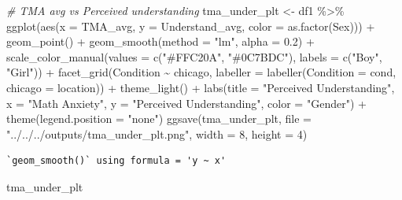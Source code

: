 \documentclass[
  letterpaper,
  DIV=11,
  numbers=noendperiod]{scrartcl}
\newenvironment{Shaded}{\begin{snugshade}}{\end{snugshade}}
\newcommand{\AttributeTok}[1]{\textcolor[rgb]{0.49,0.56,0.16}{#1}}
\newcommand{\CommentTok}[1]{\textcolor[rgb]{0.38,0.63,0.69}{\textit{#1}}}
\newcommand{\DecValTok}[1]{\textcolor[rgb]{0.25,0.63,0.44}{#1}}
\newcommand{\FloatTok}[1]{\textcolor[rgb]{0.25,0.63,0.44}{#1}}
\newcommand{\FunctionTok}[1]{\textcolor[rgb]{0.02,0.16,0.49}{#1}}
\newcommand{\NormalTok}[1]{\textcolor[rgb]{0.00,0.44,0.13}{#1}}
\newcommand{\OtherTok}[1]{\textcolor[rgb]{0.00,0.44,0.13}{#1}}
\newcommand{\SpecialCharTok}[1]{\textcolor[rgb]{0.25,0.44,0.63}{#1}}
\newcommand{\StringTok}[1]{\textcolor[rgb]{0.25,0.44,0.63}{#1}}
\begin{document}
\begin{Shaded}
\begin{Highlighting}[]
\CommentTok{\# TMA avg vs Perceived understanding}
\NormalTok{tma\_under\_plt }\OtherTok{\textless{}{-}}\NormalTok{ df1 }\SpecialCharTok{\%\textgreater{}\%} \FunctionTok{ggplot}\NormalTok{(}\FunctionTok{aes}\NormalTok{(}\AttributeTok{x =}\NormalTok{ TMA\_avg, }\AttributeTok{y =}\NormalTok{ Understand\_avg, }
                   \AttributeTok{color =} \FunctionTok{as.factor}\NormalTok{(Sex))) }\SpecialCharTok{+}
  \FunctionTok{geom\_point}\NormalTok{() }\SpecialCharTok{+} \FunctionTok{geom\_smooth}\NormalTok{(}\AttributeTok{method =} \StringTok{"lm"}\NormalTok{, }\AttributeTok{alpha =} \FloatTok{0.2}\NormalTok{) }\SpecialCharTok{+}
  \FunctionTok{scale\_color\_manual}\NormalTok{(}\AttributeTok{values =} \FunctionTok{c}\NormalTok{(}\StringTok{"\#FFC20A"}\NormalTok{, }\StringTok{"\#0C7BDC"}\NormalTok{), }
                     \AttributeTok{labels =} \FunctionTok{c}\NormalTok{(}\StringTok{"Boy"}\NormalTok{, }\StringTok{"Girl"}\NormalTok{)) }\SpecialCharTok{+}
  \FunctionTok{facet\_grid}\NormalTok{(Condition }\SpecialCharTok{\textasciitilde{}}\NormalTok{ chicago, }
             \AttributeTok{labeller =} \FunctionTok{labeller}\NormalTok{(}\AttributeTok{Condition =}\NormalTok{ cond,}
                                 \AttributeTok{chicago =}\NormalTok{ location)) }\SpecialCharTok{+}
  \FunctionTok{theme\_light}\NormalTok{() }\SpecialCharTok{+}
  \FunctionTok{labs}\NormalTok{(}\AttributeTok{title =} \StringTok{"Perceived Understanding"}\NormalTok{, }
       \AttributeTok{x =} \StringTok{"Math Anxiety"}\NormalTok{, }\AttributeTok{y =} \StringTok{"Perceived Understanding"}\NormalTok{, }\AttributeTok{color =} \StringTok{"Gender"}\NormalTok{) }\SpecialCharTok{+}  \FunctionTok{theme}\NormalTok{(}\AttributeTok{legend.position =} \StringTok{"none"}\NormalTok{)}
\FunctionTok{ggsave}\NormalTok{(tma\_under\_plt, }\AttributeTok{file =}  \StringTok{"../../../outputs/tma\_under\_plt.png"}\NormalTok{,}
       \AttributeTok{width =} \DecValTok{8}\NormalTok{, }\AttributeTok{height =} \DecValTok{4}\NormalTok{)}
\end{Highlighting}
\end{Shaded}

\begin{verbatim}
`geom_smooth()` using formula = 'y ~ x'
\end{verbatim}

\begin{Shaded}
\begin{Highlighting}[]
\NormalTok{tma\_under\_plt}
\end{Highlighting}
\end{Shaded}
\end{document}
